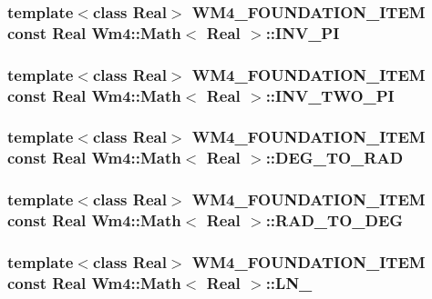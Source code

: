 \subsubsection{\setlength{\rightskip}{0pt plus 5cm}template$<$class Real$>$ WM4\_\-FOUNDATION\_\-ITEM const Real {\bf Wm4::Math}$<$ Real $>$::{\bf INV\_\-PI}\hspace{0.3cm}{\tt  [static]}}\label{classWm4_1_1Math_2c506a14173cd91d324a5eb12a819b80}


\subsubsection{\setlength{\rightskip}{0pt plus 5cm}template$<$class Real$>$ WM4\_\-FOUNDATION\_\-ITEM const Real {\bf Wm4::Math}$<$ Real $>$::{\bf INV\_\-TWO\_\-PI}\hspace{0.3cm}{\tt  [static]}}\label{classWm4_1_1Math_b807bb61cbc044afcebcf4c6e2e2cedb}


\subsubsection{\setlength{\rightskip}{0pt plus 5cm}template$<$class Real$>$ WM4\_\-FOUNDATION\_\-ITEM const Real {\bf Wm4::Math}$<$ Real $>$::{\bf DEG\_\-TO\_\-RAD}\hspace{0.3cm}{\tt  [static]}}\label{classWm4_1_1Math_0c9949da37870540982e2544895479c6}


\subsubsection{\setlength{\rightskip}{0pt plus 5cm}template$<$class Real$>$ WM4\_\-FOUNDATION\_\-ITEM const Real {\bf Wm4::Math}$<$ Real $>$::{\bf RAD\_\-TO\_\-DEG}\hspace{0.3cm}{\tt  [static]}}\label{classWm4_1_1Math_867d68abb2b53e14860b7889be367572}


\subsubsection{\setlength{\rightskip}{0pt plus 5cm}template$<$class Real$>$ WM4\_\-FOUNDATION\_\-ITEM const Real {\bf Wm4::Math}$<$ Real $>$::{\bf LN\_}\hspace{0.3cm}{\tt  [static]}}\label{classWm4_1_1Math_7809361231a77d0fdb874c690427e3d4}


